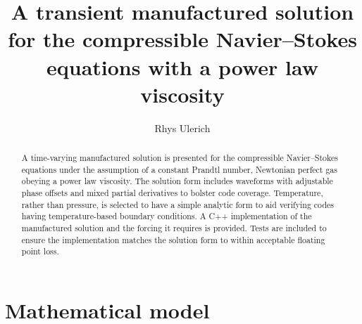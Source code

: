 \documentclass[10pt,reqno]{amsart}
\begin{document}
\title{
    A transient manufactured solution for the compressible Navier--Stokes
    equations with a power law viscosity
}
\author{Rhys Ulerich}

\begin{abstract}
A time-varying manufactured solution is presented for the compressible
Navier--Stokes equations under the assumption of a constant Prandtl number,
Newtonian perfect gas obeying a power law viscosity.  The solution form
includes waveforms with adjustable phase offsets and mixed partial derivatives
to bolster code coverage.  Temperature, rather than pressure, is selected to
have a simple analytic form to aid verifying codes having temperature-based
boundary conditions.  A C++ implementation of the manufactured solution and the
forcing it requires is provided.  Tests are included to ensure the
implementation matches the solution form to within acceptable floating point
loss.
\end{abstract}

\maketitle

\section{Mathematical model}
\end{document}
